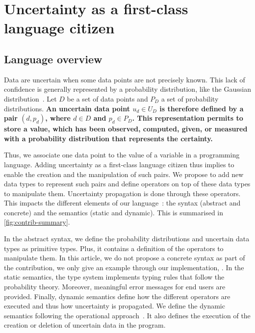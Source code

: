 \section{Uncertainty as a first-class language citizen}
\label{sec:aintea:duc}

\subsection{Language overview}
Data are uncertain when some data points are not precisely known. 
This lack of confidence is generally represented by a probability distribution, like the Gaussian distribution~\cite{metrology2008evaluation}.
Let $D$ be a set of data points and $P_D$ a set of probability distributions.
\textbf{An uncertain data point $u_d \in U_D$ is therefore defined by a pair $(d, p_d)$, where $d \in D$ and $p_d \in P_D$.
This representation permits to store a value, which has been observed, computed, given, or measured with a probability distribution that represents the certainty.}

Thus, we associate one data point to the value of a variable in a programming language.
Adding uncertainty as a first-class language citizen thus implies to enable the creation and the manipulation of such  pairs.
We propose to add new data types to represent such pairs and define operators on top of these data types to  manipulate them.
Uncertainty propagation is done through these operators.
This impacts the different elements of our language~\cite{DBLP:journals/computer/HarelR04, DBLP:phd/hal/Degueule16}: the syntax (abstract and concrete) and the semantics (static and dynamic).
This is summarised in \autoref{fig:contrib-summary}.

In the abstract syntax, we define the probability distributions and uncertain data types as primitive types.
Plus, it contains a definition of the operators to manipulate them.
In this article, we do not propose a concrete syntax as part of the contribution, we only give an example through our implementation, \langName{}.
In the static semantics, the type system implements typing rules that follow the probability theory.
Moreover, meaningful error messages for end users are provided.
Finally, dynamic semantics define how the different operators are executed and thus how uncertainty is propagated.
We define the dynamic semantics following the operational approach~\cite{DBLP:conf/ershov/Mosses01}.
It also defines the execution of the creation or deletion of uncertain data in the program.

